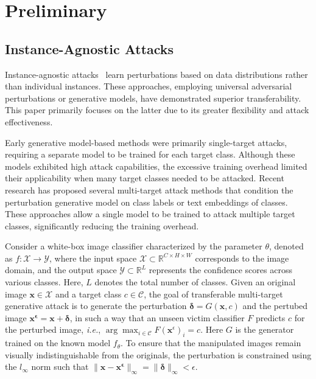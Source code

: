 \section{Preliminary}
\subsection{Instance-Agnostic Attacks}

Instance-agnostic attacks~\cite{luo2021generating,kong2020physgan,wang2019gan,poursaeed2018generative,yang2022boosting,naseer2021generating,naseer2019cross} learn perturbations based on data distributions rather than individual instances. These approaches, employing universal adversarial perturbations\cite{moosavi2017universal, zhang2020understanding} or generative models, have demonstrated superior transferability. This paper primarily focuses on the latter due to its greater flexibility and attack effectiveness.

Early generative model-based methods were primarily single-target attacks\cite{xiao2018generating, naseer2019cross, naseer2021generating, feng2023dynamic, wang2023towards}, requiring a separate model to be trained for each target class. Although these models exhibited high attack capabilities, the excessive training overhead limited their applicability when many target classes needed to be attacked. Recent research has proposed several multi-target attack methods\cite{yang2022boosting, fang2025clip} that condition the perturbation generative model on class labels\cite{yang2022boosting} or text embeddings\cite{fang2025clip} of classes. These approaches allow a single model to be trained to attack multiple target classes, significantly reducing the training overhead.


Consider a white-box image classifier characterized by the parameter $\theta$, denoted as $f: \mathcal{X} \to \mathcal{Y}$, 
where the input space $\mathcal{X} \subset \mathbb{R}^{C \times H \times W}$ corresponds to the image domain, and the output space 
$\mathcal{Y} \subset \mathbb{R}^{L}$ represents the confidence scores across various classes. Here, $L$ denotes the total number of classes. Given an original image $\mathbf{x} \in \mathcal{X}$ and a target class 
$c \in \mathcal{C}$, the goal of transferable multi-target generative attack is to generate the perturbation
$\boldsymbol{\delta} = G(\mathbf{x}, c)$ and the pertubed image $\boldsymbol{\mathbf{x^{\epsilon}}} = \mathbf{x} + \boldsymbol{\delta}$, in such a way that an unseen victim classifier $F$ predicts $c$ for the perturbed image, 
\textit{i.e.}, $\arg\max_{i \in \mathcal{C}} F(\mathbf{x}^\epsilon)_{i} = c$. Here $G$ is the generator trained on the known model $f_{\theta}$. To ensure that the manipulated images remain visually 
indistinguishable from the originals, the perturbation is constrained using the $l_{\infty}$ norm such that $\|\boldsymbol{\mathbf{x} - \mathbf{x}^\epsilon}\|_{\infty} = \| \boldsymbol{\delta}\|_{\infty}< \epsilon$. 


